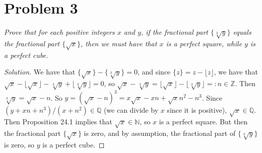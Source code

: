 \documentclass{article}
\newcommand{\N}{{\mathbb N}}
\newcommand{\Z}{{\mathbb Z}}
\newcommand{\Q}{{\mathbb Q}}
\begin{document}
\clearpage

\section*{Problem 3}
{\it Prove that for each positive integers $x$ and $y$,
	if the fractional part $\{\sqrt[3]{y}\}$ equals the fractional part $\{\sqrt{x}\}$,
	then we must have that $x$ is a perfect square, while $y$ is a perfect cube.
}
\begin{proof}[Solution]\let\qed\relax
	We have that $\{\sqrt{x}\} - \{\sqrt[3]{y}\} = 0$,
	and since $\{z\} = z - \lfloor z \rfloor$, we have that
	$\sqrt{x} - \lfloor \sqrt{x} \rfloor - \sqrt[3]{y} + \lfloor \sqrt[3]{y} \rfloor = 0$,
	so $\sqrt{x} - \sqrt[3]{y} = \lfloor \sqrt{x} \rfloor - \lfloor \sqrt[3]{y} \rfloor =: n \in \Z$.
	Then $\sqrt[3]{y} = \sqrt{x} - n$.
	So $y = (\sqrt{x} - n)^3 = x\sqrt{x} - xn + \sqrt{x}n^2 - n^3$.
	Since $(y + xn + n^3)/(x+n^2) \in \Q$ (we can divide by $x$ since it is positive),
	$\sqrt{x} \in \Q$.
	Then Proposition 24.1 implies that $\sqrt{x}\in\N$, so $x$ is a perfect square.
	But then the fractional part $\{\sqrt{x}\}$ is zero,
	and by assumption, the fractional part of $\{\sqrt[3]{y}\}$ is zero,
	so $y$ is a perfect cube.
\end{proof}
\end{document}
